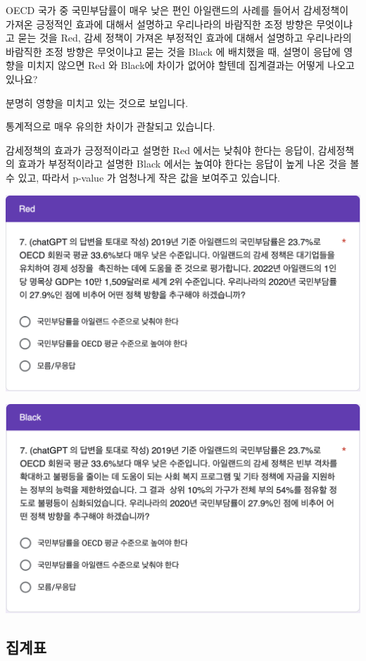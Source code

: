 \documentclass[
]{book}
\begin{document}
OECD 국가 중 국민부담률이 매우 낮은 편인 아일랜드의 사례를 들어서 감세정책이 가져온 긍정적인 효과에 대해서 설명하고 우리나라의 바람직한 조정 방향은 무엇이냐고 묻는 것을 Red, 감세 정책이 가져온 부정적인 효과에 대해서 설명하고 우리나라의 바람직한 조정 방향은 무엇이냐고 묻는 것을 Black 에 배치했을 때, 설명이 응답에 영향을 미치지 않으면 Red 와 Black에 차이가 없어야 할텐데 집계결과는 어떻게 나오고 있나요?

분명히 영향을 미치고 있는 것으로 보입니다.

통계적으로 매우 유의한 차이가 관찰되고 있습니다.

감세정책의 효과가 긍정적이라고 설명한 Red 에서는 낮춰야 한다는 응답이, 감세정책의 효과가 부정적이라고 설명한 Black 에서는 높여야 한다는 응답이 높게 나온 것을 볼 수 있고, 따라서 p-value 가 엄청나게 작은 값을 보여주고 있습니다.

\includegraphics[width=0.67\linewidth]{./pics/Quiz240315_Q7_Red}

\includegraphics[width=0.67\linewidth]{./pics/Quiz240315_Q7_Black}

\subsection{집계표}\label{uxc9d1uxacc4uxd45c-1}
\end{document}
